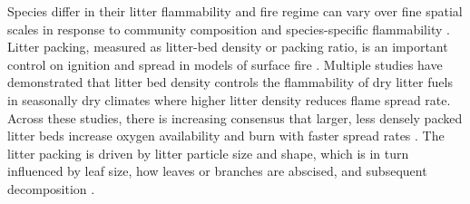 \documentclass[letterpaper,12pt]{article}
\begin{document}
Species differ in their litter flammability \citep{Fonda+Belanger+etal-1998,
  Fonda-2001, Scarff+Westoby-2006, Kane+Varner+etal-2008,
  Cornwell+Elvira+etal-2015} and fire regime can vary over fine spatial scales
in response to community composition and species-specific flammability
\citep{Stephens-2001, Hille+Stephens-2005, Schwilk+Caprio-2011}. Litter
packing, measured as litter-bed density or packing ratio, is an important
control on ignition and spread in models of surface fire \citep{Weber-1991,
  Balbi+Santoni+etal-1999, Morvan+Larini-2001}. Multiple studies have
demonstrated that litter bed density controls the flammability of dry litter
fuels in seasonally dry climates where higher litter density reduces flame
spread rate. Across these studies, there is increasing consensus that larger,
less densely packed litter beds increase oxygen availability and burn with
faster spread rates \citep{Scarff+Westoby-2006, Schwilk+Caprio-2011,
  Magalhaes+Schwilk-2012, Cornwell+Elvira+etal-2015, Varner+Kane+etal-2015,
  Kreye+Varner+etal-2018}. The litter packing is driven by litter particle size
and shape, which is in turn influenced by leaf size, how leaves or branches are
abscised, and subsequent decomposition \citep{Fonda+Belanger+etal-1998,
  Stephens+Finney+etal-2004, Scarff+Westoby-2006, Kane+Varner+etal-2008,
  Cornwell+Elvira+etal-2015, Zhao+Cornwell+etal-2016,
  Grootemaat+Wright+etal-2017, Prior+Murphy+etal-2018,
  Zhao+vanLogtestijn+etal-2019}.
\end{document}
